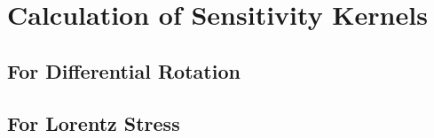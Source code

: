 \chapter{Calculation of Sensitivity Kernels} 

\section{For Differential Rotation}


\section{For Lorentz Stress}